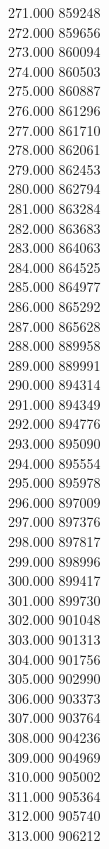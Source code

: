 { 271.000	859248 \\
 272.000	859656 \\
 273.000	860094 \\
 274.000	860503 \\
 275.000	860887 \\
 276.000	861296 \\
 277.000	861710 \\
 278.000	862061 \\
 279.000	862453 \\
 280.000	862794 \\
 281.000	863284 \\
 282.000	863683 \\
 283.000	864063 \\
 284.000	864525 \\
 285.000	864977 \\
 286.000	865292 \\
 287.000	865628 \\
 288.000	889958 \\
 289.000	889991 \\
 290.000	894314 \\
 291.000	894349 \\
 292.000	894776 \\
 293.000	895090 \\
 294.000	895554 \\
 295.000	895978 \\
 296.000	897009 \\
 297.000	897376 \\
 298.000	897817 \\
 299.000	898996 \\
 300.000	899417 \\
 301.000	899730 \\
 302.000	901048 \\
 303.000	901313 \\
 304.000	901756 \\
 305.000	902990 \\
 306.000	903373 \\
 307.000	903764 \\
 308.000	904236 \\
 309.000	904969 \\
 310.000	905002 \\
 311.000	905364 \\
 312.000	905740 \\
 313.000	906212 \\
}
